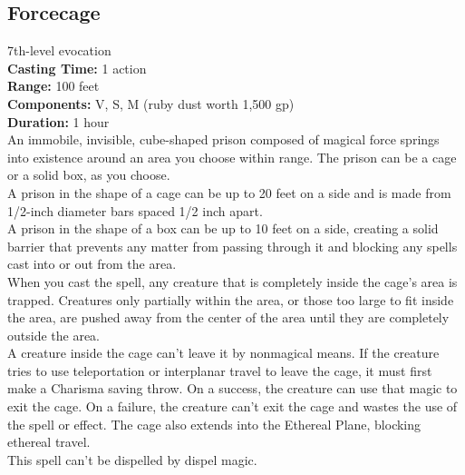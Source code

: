 \documentclass[11pt, A4paper, english]{article}
\begin{document}
		\subsection{Forcecage}
7th-level evocation \\
\textbf{Casting Time:} 1 action \\
\textbf{Range:} 100 feet \\
\textbf{Components:} V, S, M (ruby dust worth  1,500 gp) \\
\textbf{Duration:} 1 hour \\
An immobile, invisible, cube-shaped prison composed of magical force springs into existence around an area you choose within range. The prison can be a cage or a solid box, as you choose. \\
A prison in the shape of a cage can be up to 20 feet on a side and is made from  1/2-inch diameter bars spaced 1/2 inch apart. \\
A prison in the shape of a box can be up to 10 feet on a side, creating a solid barrier that prevents any matter from passing through it and blocking any spells cast into or out from the area. \\
When you cast the spell, any creature that is completely inside the cage's area is trapped. Creatures only partially within the area, or those too large to fit inside the area, are pushed away from the center of the area until they are completely outside the area. \\
A creature inside the cage can’t leave it by nonmagical means. If the creature tries to use teleportation or interplanar travel to leave the cage, it must first make a Charisma saving throw. On a success, the creature can use that magic to exit the cage. On a failure, the creature can't exit the cage and wastes the use of the spell or effect. The cage also extends into the Ethereal Plane, blocking ethereal travel. \\
This spell can’t be dispelled by dispel magic.
\end{document}

